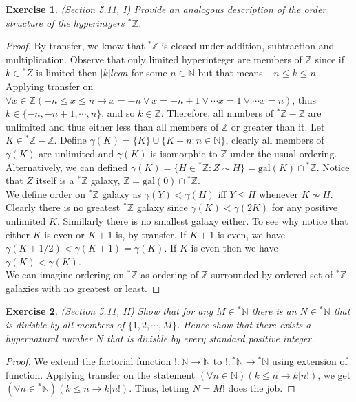 \documentclass[a4paper, 11pt, openany]{book}
\theoremstyle{plain}
\newtheorem{exercise}{Exercise}[chapter]
\theoremstyle{plain}
\newcommand{\arr}{\rightarrow}
\newcommand{\N}{\mathbb{N}}
\newcommand{\Z}{\mathbb{Z}}
\newcommand{\hyp}{{}^*}
\newcommand{\gal}{\text{gal}}
\begin{document}
  \begin{exercise}
    (Section 5.11, I)
    Provide an analogous description of the order structure of the hyperintgers $\hyp \Z$.
  \end{exercise}
  \begin{proof}
    By transfer, we know that $\hyp \Z$ is closed under addition, subtraction and multiplication. Observe that only limited hyperinteger are members of $\Z$ since if $k \in \hyp Z$ is limited then $|k| leq n$ for some $n \in \N$ but that means $-n \leq k \leq n$. Applying transfer on $\forall x \in \Z (-n \leq x \leq n \rightarrow x=-n \lor x=-n+1 \lor \cdots x=1 \lor \cdots x=n)$, thus $k \in \{-n, -n+1, \cdots, n\}$, and so $k \in \Z$. Therefore, all numbers of $\hyp \Z-\Z$ are unlimited and thus either less than all members of $\Z$ or greater than it. Let $K \in \hyp \Z - \Z$. Define $\gamma (K)=\{K\} \cup \{K \pm n: n \in \N\}$, clearly all members of $\gamma(K)$ are unlimited and $\gamma(K)$ is isomorphic to $\Z$ under the usual ordering. Alternatively, we can defined $\gamma(K)=\{H \in \hyp \Z: Z \sim H\}=\gal(K) \cap \hyp \Z$. Notice that $Z$ itself is a $\hyp \Z$ galaxy, $\Z=\gal(0) \cap \hyp \Z$. \\

    We define order on $\hyp \Z$ galaxy as $\gamma(Y)< \gamma (H)$ iff $Y \leq H$ whenever $K \not \sim H$. Clearly there is no greatest $\hyp \Z$ galaxy since $\gamma(K)< \gamma (2K)$ for any positive unlimited $K$. Simillarly there is no smallest galaxy either. To see why notice that either $K$ is even or $K+1$ is, by transfer. If $K+1$ is even, we have $\gamma(K+1/2)<\gamma(K+1)=\gamma(K)$. If $K$ is even then we have $\gamma(K)<\gamma(K)$. \\

    We can imagine ordering on $\hyp \Z$ as ordering of $\Z$ surrounded by ordered set of $\hyp \Z$ galaxies with no greatest or least.
  \end{proof}

  \begin{exercise}
    (Section 5.11, II)
    Show that for any $M \in \hyp \N$ there is an $N \in \hyp \N$ that is divisble by all members of $\{1,2,\cdots, M\}$. Hence show that there exists a hypernatural number $N$ that is divisble by every standard positive integer.
  \end{exercise}
  \begin{proof}
    We extend the factorial function $!:\N \rightarrow \N$ to $!:\hyp \N \arr \hyp \N$ using extension of function. Applying transfer on the statement $(\forall n \in \N)(k \leq n \arr k|n!)$, we get $(\forall n \in \hyp \N)(k \leq n \arr k|n!)$. Thus, letting $N=M!$ does the job.
  \end{proof}
\end{document}
